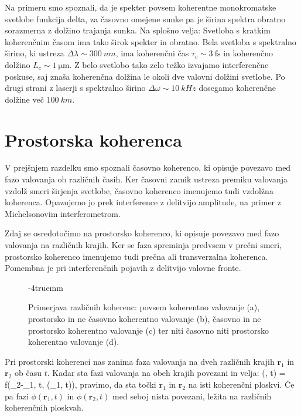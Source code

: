 Na primeru smo spoznali, da je spekter povsem koherentne monokromatske svetlobe funkcija delta, 
za časovno omejene sunke pa je širina spektra obratno sorazmerna z dolžino trajanja sunka. Na splošno
velja:
Svetloba s kratkim koherenčnim časom ima tako širok spekter in obratno. Bela svetloba s spektralno
širino, ki ustreza $\Delta \lambda \sim 300~\si{nm}$, ima koherenčni čas $\tau_c \sim 3~\si{\femto\second}$
in koherenčno dolžino $L_c \sim 1~\si{\micro\meter}$. Z belo svetlobo tako zelo težko
izvajamo interferenčne poskuse, saj znaša koherenčna dolžina le okoli dve valovni dolžini svetlobe.
Po drugi strani z laserji s spektralno širino $\Delta \omega \sim 10~\si{kHz}$ 
dosegamo koherenčne dolžine več $100~\si{km}$. 

\section{Prostorska koherenca}
V prejšnjem razdelku smo spoznali časovno koherenco, ki opisuje povezavo
med fazo valovanja ob različnih časih. Ker časovni zamik ustreza premiku valovanja
vzdolž smeri širjenja svetlobe, časovno koherenco imenujemo tudi vzdolžna koherenca. Opazujemo
jo prek interference z delitvijo amplitude, na primer z Michelsonovim interferometrom. 

Zdaj se osredotočimo na prostorsko koherenco, ki opisuje povezavo med fazo valovanja
na različnih krajih. Ker se faza spreminja predvsem v prečni smeri, prostorsko
koherenco imenujemo tudi prečna ali transverzalna koherenca. 
Pomembna je pri interferenčnih pojavih z delitvijo valovne fronte. 
\begin{figure}[h]
\centering
\def\svgwidth{140truemm} 

\caption{Primerjava različnih koherenc: povsem koherentno valovanje (a), prostorsko in 
ne časovno koherentno valovanje (b), časovno in ne prostorsko koherentno valovanje (c) ter
niti časovno niti prostorsko koherentno valovanje (d).
}
\label{fig:08_kohprimer}
\vglue-4truemm
\end{figure}

Pri prostorski koherenci nas zanima faza valovanja na dveh različnih krajih $\mathbf{r}_1$ 
in $\mathbf{r}_2$ ob času $t$. Kadar sta fazi valovanja na obeh krajih povezani in velja:
\beq
\phi(, t) =  f(_2-_1, t, \phi(_1, t)),
\label{eq:08_28}
\eeq
pravimo, da sta točki $\mathbf{r}_1$ in $\mathbf{r}_2$ na isti koherenčni ploskvi. Če pa
fazi $\phi(\mathbf{r}_1, t)$ in $\phi(\mathbf{r}_2, t)$ med seboj nista povezani, ležita
na različnih koherenčnih ploskvah. 

